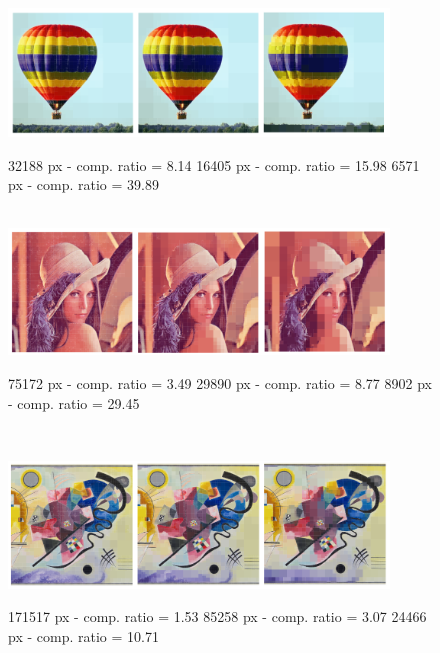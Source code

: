 \documentclass[8pt]{beamer}
\begin{document}
\begin{frame}
\begin{center}
 \begin{figure}[!h]
\includegraphics[width=0.9\textwidth]{./figures/s3_comp_small} \\
\begin{footnotesize}32188 px - comp. ratio = 8.14 \hfill 16405 px - comp. ratio = 15.98 \hfill 6571 px - comp. ratio = 39.89 \end{footnotesize} \\
\pause
\includegraphics[width=0.9\textwidth]{./figures/s4_comp_small}\\
\begin{footnotesize}75172 px - comp. ratio = 3.49 \hfill 29890 px - comp. ratio = 8.77 \hfill 8902 px - comp. ratio = 29.45 \end{footnotesize} \\
\end{figure}
\end{center}
\end{frame}

\begin{frame}
\begin{center}
 \begin{figure}[!h]
\includegraphics[width=0.9\textwidth]{./figures/s6_comp_small}\\
\begin{footnotesize}171517 px - comp. ratio = 1.53 \hfill 85258 px - comp. ratio = 3.07 \hfill 24466 px - comp. ratio = 10.71
\end{footnotesize} \\
\end{figure}
\end{center}
\end{frame}
\end{document}
